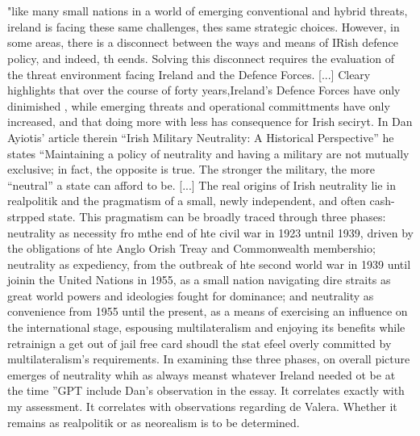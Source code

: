 \section{\parencite{CARROLL_2023}} "like many small nations in a world of emerging conventional and hybrid threats, ireland is facing these same challenges, thes same strategic choices. However, in some areas, there is a disconnect between the ways and means of IRish defence policy, and indeed, th eends. Solving this disconnect requires the evaluation of the threat environment facing Ireland and the Defence Forces. [...] Cleary highlights that over the course of forty years,Ireland's Defence Forces have only dinimished , while emerging threats and operational committments have only increased, and that doing more with less has consequence for Irish seciryt. In Dan Ayiotis' article therein ``Irish Military Neutrality: A Historical Perspective'' he states ``Maintaining a policy of neutrality and having a military are not mutually exclusive; in fact, the opposite is true. The stronger the military, the more ``neutral'' a state can afford to be. [...] The real origins of Irish neutrality lie in realpolitik and the pragmatism of a small, newly independent, and often cash-strpped state. This pragmatism can be broadly traced through three phases: neutrality as necessity fro mthe end of hte civil war in 1923 untnil 1939, driven by the obligations of hte Anglo Orish Treay and Commonwealth membershio; neutrality as expediency, from the outbreak of hte second world war in 1939 until joinin the United Nations in 1955, as a small nation navigating dire straits as great world powers and ideologies fought for dominance; and neutrality as convenience from 1955 until the present, as a means of exercising an influence on the international stage, espousing multilateralism and enjoying its benefits while retrainign a get out of jail free card shoudl the stat efeel overly committed by multilateralism's requirements. In examining thse three phases, on overall picture emerges of neutrality whih as always meanst whatever Ireland needed ot be at the time ''GPT include Dan's observation in the essay. It correlates exactly with my assessment. It correlates with observations regarding de Valera. Whether it remains as realpolitik or as neorealism is to be determined. 
 
